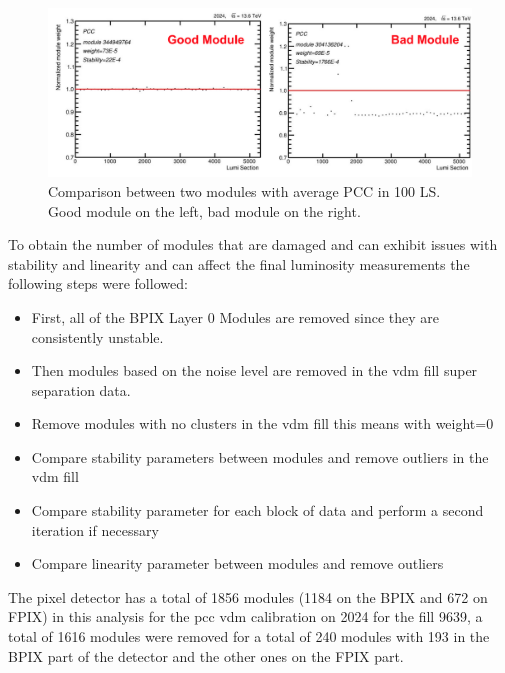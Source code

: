 \begin{figure}[H]
    \centering
    \includegraphics[height=0.35\textwidth ,width=1\textwidth]{module.png}
    \caption{Comparison between two modules with average PCC in 100 LS. Good module on the left, bad module on the right.}
    \label{fig:modules}
\end{figure}


To obtain the number of modules that are damaged and can exhibit issues with stability and linearity and can affect the final luminosity measurements the following steps were followed: 

\begin{itemize}
  \item First, all of the BPIX Layer 0 Modules are removed since they are consistently unstable.
  \item Then modules based on the noise level are removed in the vdm fill super separation data. 
  \item Remove modules with no clusters in the vdm fill this means with weight=0 
  \item Compare stability parameters between modules and remove outliers in the vdm fill
  \item Compare stability parameter for each block of data and perform a second iteration if necessary
  \item Compare linearity parameter between modules and remove outliers
\end{itemize}

The pixel detector has a total of 1856 modules (1184 on the BPIX and 672 on FPIX) in this analysis for the pcc vdm calibration on 2024 for the fill 9639, a total of 1616 modules were removed for a total of 240 modules with 193 in the BPIX part of the detector and the other ones on the FPIX part. 
